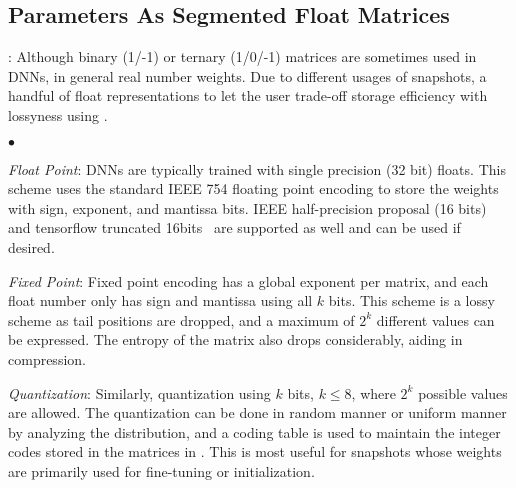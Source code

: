 \documentclass[conference]{IEEEtran}
\begin{document}
\subsection{Parameters As Segmented Float Matrices}
\label{subsec:pas_float}


: 
Although binary (1/-1) or ternary (1/0/-1) matrices are sometimes used in DNNs, in general \weightstore\handles real number weights. Due to different usages of snapshots, \weightstore\offers a handful of float representations to let the user trade-off storage efficiency with lossyness using \dlv. %
\begin{list}{$\bullet$}{\leftmargin 0.10in \topsep -2pt} %
\item \emph{Float Point}: DNNs are typically trained with single precision (32 bit) floats. This scheme uses the standard IEEE 754 floating point encoding to store the weights with sign, exponent, and mantissa bits. IEEE half-precision proposal (16 bits) and tensorflow truncated 16bits~\cite{tensorflow} are supported as well and can be used if desired.
\item \emph{Fixed Point}: Fixed point encoding has a global exponent per matrix, and each float number only has sign and mantissa using all $k$ bits. This scheme is a lossy scheme as tail positions are dropped, and a maximum of $2^k$ different values can be expressed. The entropy of the matrix also drops considerably, aiding in compression.
\item \emph{Quantization}: Similarly, \weightstore\supports quantization using $k$ bits, $k\leq8$, where $2^k$ possible values are allowed. The quantization can be done in random manner or uniform manner by analyzing the distribution, and a coding table is used to maintain the  integer codes stored in the matrices in \weightstore\eat{)}.
This is most useful for snapshots whose weights are primarily used for fine-tuning or initialization.
\end{list}
\end{document}
